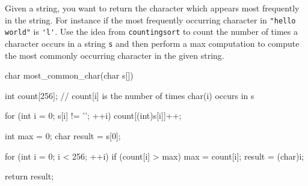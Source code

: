 \nextq
Given a string, you want to return the character which appears most
frequently in the string.
For instance if the most frequently occurring character in
\verb!"hello world"! is \verb!'l'!.
Use the idea from \verb!countingsort! to count the number of times
a character occurs in a string \verb!s! and then perform a max
computation to compute the most commonly occurring character in the given
string.
\\
\ANSWER
\begin{answercode}
char most_common_char(char s[])
{
  int count[256]; // count[i] is the number of times char(i) occurs in s

  for (int i = 0; s[i] != '\0'; ++i)
  {
    count[(int)s[i]]++;
  }

  int max = 0;
  char result = s[0];

  for (int i = 0; i < 256; ++i)
  {
    if (count[i] > max)
    {
      max = count[i];
      result = (char)i;
    }
  }

  return result;
}
\end{answercode}


